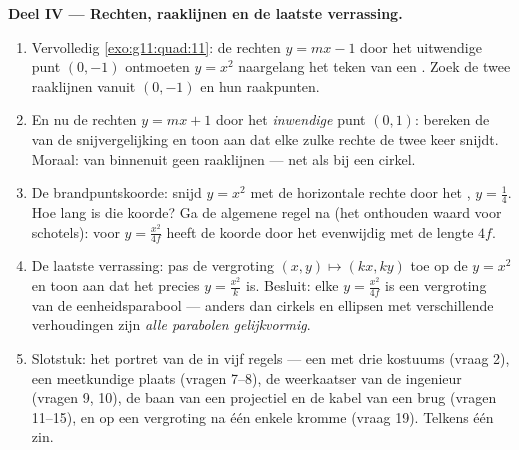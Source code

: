 \begin{problem}
\medskip
\noindent\textbf{Deel IV --- Rechten, raaklijnen en de laatste verrassing.}
\begin{enumerate}[resume]
  \item Vervolledig \cref{exo:g11:quad:11}: de rechten $y = mx - 1$ door het
        uitwendige punt $(0, -1)$ ontmoeten $y = x^2$ naargelang het teken
        van een . Zoek de twee raaklijnen vanuit $(0, -1)$ en hun
        raakpunten.
  \item En nu de rechten $y = mx + 1$ door het \emph{inwendige} punt
        $(0, 1)$: bereken de  van de snijvergelijking en toon aan
        dat elke zulke rechte de  twee keer snijdt. Moraal: van
        binnenuit geen raaklijnen --- net als bij een cirkel.
  \item De brandpuntskoorde: snijd $y = x^2$ met de horizontale rechte door
        het , $y = \frac14$. Hoe lang is die koorde? Ga de algemene
        regel na (het onthouden waard voor schotels): voor
        $y = \frac{x^2}{4f}$ heeft de koorde door het  evenwijdig
        met de  lengte $4f$.
  \item De laatste verrassing: pas de vergroting $(x, y) \mapsto (kx, ky)$
        toe op de  $y = x^2$ en toon aan dat het  precies
        $y = \frac{x^2}{k}$ is. Besluit: elke  $y = \frac{x^2}{4f}$
        is een vergroting van de eenheidsparabool --- anders dan cirkels en
        ellipsen met verschillende verhoudingen zijn \emph{alle parabolen
        gelijkvormig}.
  \item Slotstuk: het portret van de  in vijf regels --- een
         met drie kostuums (vraag 2), een meetkundige plaats
        (vragen 7--8), de weerkaatser van de ingenieur (vragen 9, 10), de
        baan van een projectiel en de kabel van een brug (vragen 11--15), en
        op een vergroting na één enkele kromme (vraag 19). Telkens één zin.
\end{enumerate}
\end{problem}
